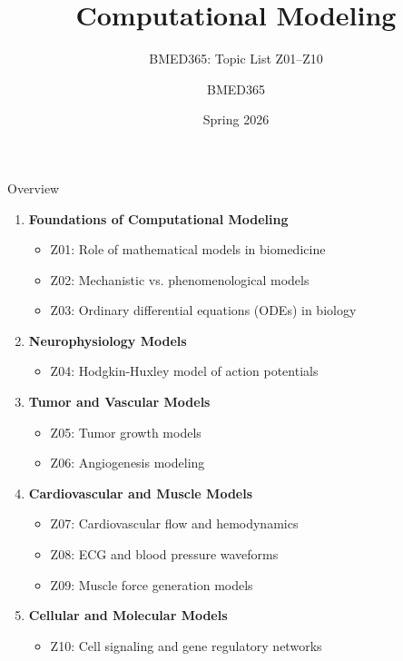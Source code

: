 \documentclass[aspectratio=169, 10pt]{beamer}
\title{Computational Modeling}
\subtitle{BMED365: Topic List Z01--Z10}
\author{BMED365}
\date{Spring 2026}
\begin{document}
\begin{frame}
    \titlepage
\end{frame}

\begin{frame}{Overview}
    \begin{enumerate}
        \item \textbf{Foundations of Computational Modeling}
        \begin{itemize}
            \item Z01: Role of mathematical models in biomedicine
            \item Z02: Mechanistic vs. phenomenological models
            \item Z03: Ordinary differential equations (ODEs) in biology
        \end{itemize}
        \item \textbf{Neurophysiology Models}
        \begin{itemize}
            \item Z04: Hodgkin-Huxley model of action potentials
        \end{itemize}
        \item \textbf{Tumor and Vascular Models}
        \begin{itemize}
            \item Z05: Tumor growth models
            \item Z06: Angiogenesis modeling
        \end{itemize}
        \item \textbf{Cardiovascular and Muscle Models}
        \begin{itemize}
            \item Z07: Cardiovascular flow and hemodynamics
            \item Z08: ECG and blood pressure waveforms
            \item Z09: Muscle force generation models
        \end{itemize}
        \item \textbf{Cellular and Molecular Models}
        \begin{itemize}
            \item Z10: Cell signaling and gene regulatory networks
        \end{itemize}
    \end{enumerate}
\end{frame}

\end{document}
